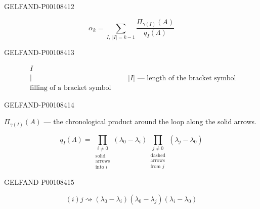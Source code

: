 \begin{GelfandAdjacentEvidence}{GELFAND-P001084}{12}


\begin{equation*}
\alpha_k=\sum_{I,\ \lvert I\rvert=k-1}\frac{\Pi_{\gamma(I)}(A)}{q_I(\Lambda)}
\tag{11}
\end{equation*}
\end{GelfandAdjacentEvidence}
\begin{GelfandAdjacentEvidence}{GELFAND-P001084}{13}


\[
\begin{array}{l}
I\\[-.3ex]
\vert\\[-.3ex]
\text{filling of a bracket symbol}
\end{array}
\qquad
\lvert I\rvert\text{ — length of the bracket symbol}
\]
\end{GelfandAdjacentEvidence}
\begin{GelfandAdjacentEvidence}{GELFAND-P001084}{14}


$\Pi_{\gamma(I)}(A)$ — the chronological product around the loop along the solid arrows.

\begin{equation*}
q_I(\Lambda)=
\underset{\substack{\text{solid}\\\text{arrows}\\\text{into }i}}
{\prod_{i\ne0}}(\lambda_0-\lambda_i)
\underset{\substack{\text{dashed}\\\text{arrows}\\\text{from }j}}
{\prod_{j\ne0}}(\lambda_j-\lambda_0)
\tag{12}
\end{equation*}
\end{GelfandAdjacentEvidence}
\begin{GelfandAdjacentEvidence}{GELFAND-P001084}{15}


\[
(i)j\rightsquigarrow
(\lambda_0-\lambda_i)(\lambda_0-\lambda_j)(\lambda_i-\lambda_0)
\]
\end{GelfandAdjacentEvidence}



